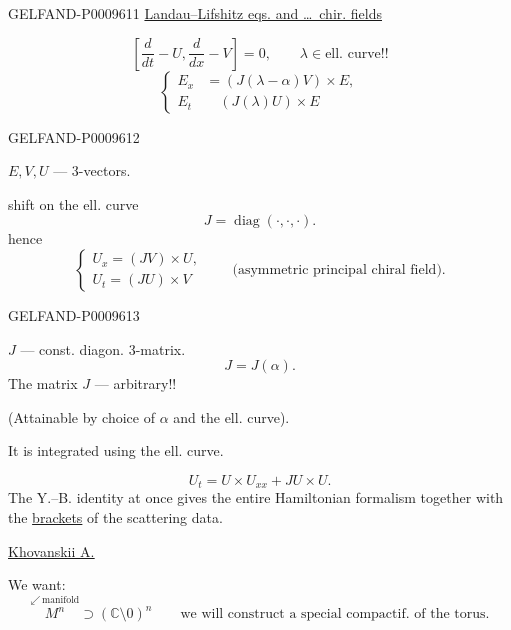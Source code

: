 \begin{GelfandAdjacentEvidence}{GELFAND-P000961}{1}
\underline{Landau–Lifshitz eqs. and \ldots\ chir. fields}

\begin{equation*}
 \left[\frac{d}{dt}-U,\frac{d}{dx}-V\right]=0,
 \qquad \lambda\in\text{ell. curve!!}\tag{7}
\end{equation*}
\begin{equation*}
 \left\{\begin{aligned}
 E_x&=(J(\lambda-\alpha)V)\times E,\\
 E_t&\quad (J(\lambda)U)\times E
 \end{aligned}\right.\tag{8}
\end{equation*}
\end{GelfandAdjacentEvidence}
\begin{GelfandAdjacentEvidence}{GELFAND-P000961}{2}


$E,V,U$ --- 3-vectors.

shift on the ell. curve
\[
 J=\operatorname{diag}(\cdot,\cdot,\cdot).
\]
hence
\begin{equation*}
 \begin{cases}
 U_x=(JV)\times U,\\
 U_t=(JU)\times V
 \end{cases}
 \qquad\text{(asymmetric principal chiral field).}\tag{9}
\end{equation*}
\end{GelfandAdjacentEvidence}
\begin{GelfandAdjacentEvidence}{GELFAND-P000961}{3}


$J$ --- const. diagon. 3-matrix.
\[
 J=J(\alpha).
\]
The matrix $J$ --- arbitrary!!

(Attainable by choice of $\alpha$ and the ell. curve).

It is integrated using the ell. curve.

\begin{equation*}
 U_t=U\times U_{xx}+JU\times U.\tag{10}
\end{equation*}
The Y.–B. identity at once gives the entire Hamiltonian formalism together with the \underline{brackets} of the scattering data.

\underline{\underline{Khovanskii A.}}

We want:
\[
 \overset{\swarrow\,\text{manifold}}{M^n}\supset(\mathbb{C}\setminus0)^n
 \qquad\text{we will construct a special compactif. of the torus.}
\]
\end{GelfandAdjacentEvidence}
